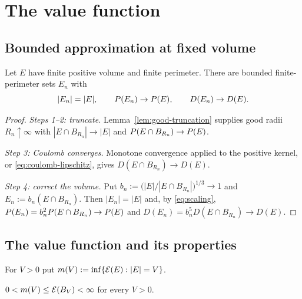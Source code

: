 \chapter{The value function}\label{ch:value}

\section{Bounded approximation at fixed volume}

\begin{lemma}\label{lem:bounded-approx}
Let $E$ have finite positive volume and finite perimeter.  There are bounded
finite-perimeter sets $E_n$ with
\[
  |E_n|=|E|,\qquad P(E_n)\to P(E),\qquad D(E_n)\to D(E).
\]
\end{lemma}

\begin{proof}
\emph{Steps 1--2: truncate.}  Lemma~\ref{lem:good-truncation} supplies good
radii $R_n\uparrow\infty$ with $|E\cap B_{R_n}|\to|E|$ and
$P(E\cap B_{R_n})\to P(E)$.

\emph{Step 3: Coulomb converges.}  Monotone convergence applied to the
positive kernel, or \eqref{eq:coulomb-lipschitz}, gives
$D(E\cap B_{R_n})\to D(E)$.

\emph{Step 4: correct the volume.}  Put
$b_n:=\bigl(|E|/|E\cap B_{R_n}|\bigr)^{1/3}\to1$ and
$E_n:=b_n(E\cap B_{R_n})$.  Then $|E_n|=|E|$ and, by
\eqref{eq:scaling}, $P(E_n)=b_n^2P(E\cap B_{R_n})\to P(E)$ and
$D(E_n)=b_n^5D(E\cap B_{R_n})\to D(E)$.
\end{proof}

\section{The value function and its properties}

\begin{definition}\label{def:value}
For $V>0$ put $m(V):=\inf\{\mathcal E(E):|E|=V\}$.
\end{definition}

\begin{lemma}\label{lem:m-finite}
$0<m(V)\le\mathcal E(B_V)<\infty$ for every $V>0$.
\end{lemma}


